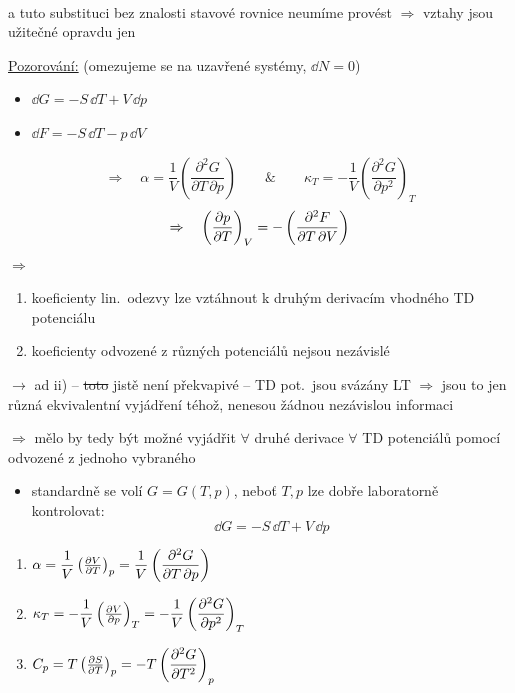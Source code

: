  \\
\quad a tuto substituci bez znalosti stavové rovnice neumíme provést $\Rightarrow$ vztahy jsou užitečné opravdu jen 

\underline{Pozorování:} (omezujeme se na uzavřené systémy, $\dd N = 0$)
\begin{itemize}[nosep]
  \item $\dd G = -S\,\dd T + V\,\dd p$
  \item $\dd F = -S\,\dd T - p\,\dd V$
\end{itemize}
\[
  \Rightarrow\quad \alpha = \frac1V\left(\frac{\partial^2G}{\partial T\,\partial p}\right)
  \qquad\&\qquad
  \kappa_T = -\frac1V\left(\frac{\partial^2G}{\partial p^2}\right)_T
\]
\[
  \Rightarrow\quad \left(\pdv{p}{T}\right)_V = -\left(\frac{\partial^2F}{\partial T\,\partial V}\right)
\]
$\Rightarrow$
\begin{enumerate}[label=\roman*)]
  \item koeficienty lin.\ odezvy lze vztáhnout k druhým derivacím vhodného TD potenciálu
  \item koeficienty odvozené z různých potenciálů nejsou nezávislé
\end{enumerate}

$\to$ ad ii) -- \sout{toto} jistě není překvapivé -- TD pot.\ jsou svázány LT $\Rightarrow$ jsou to jen různá ekvivalentní vyjádření téhož, nenesou žádnou nezávislou informaci

$\Rightarrow$ mělo by tedy být možné vyjádřit $\forall$ druhé derivace $\forall$ TD potenciálů pomocí  odvozené z jednoho vybraného
\begin{itemize}
  \item standardně se volí $G = G(T,p)$, neboť $T,p$ lze dobře laboratorně kontrolovat:
  \[ \dd G = -S\,\dd T + V\,\dd p \]
\end{itemize}

\begin{minipage}{0.7\textwidth}
\begin{enumerate}[label=\arabic*)]
  \item $\alpha = \dfrac1V\left(\pdv{V}{T}\right)_p = \dfrac1V\left(\dfrac{\partial^2G}{\partial T\,\partial p}\right)$
        \ 
  \item $\kappa_T = -\dfrac1V\left(\pdv{V}{p}\right)_T = -\dfrac1V\left(\dfrac{\partial^2G}{\partial p^2}\right)_T$
  \item $C_p = T\left(\pdv{S}{T}\right)_p = -T\left(\dfrac{\partial^2G}{\partial T^2}\right)_p$
\end{enumerate}
\end{minipage}
\begin{minipage}{0.28\textwidth}
\centering
{}

\cervene{$\Uparrow$}
\end{minipage}

